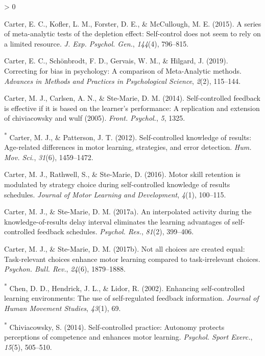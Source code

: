 \documentclass[
  english,
  man,floatsintext]{apa7}
\newlength{\cslhangindent}
\newenvironment{CSLReferences}[2] %
 {%
  \setlength{\parindent}{0pt}
  \ifodd #1 \everypar{\setlength{\hangindent}{\cslhangindent}}\ignorespaces\fi
  \ifnum #2 > 0
  \setlength{\parskip}{#2\baselineskip}
  \fi
 }%
 {}
\begin{document}
\begin{CSLReferences}{1}{0}
\leavevmode\hypertarget{ref-Carter2015-zk}{}%
Carter, E. C., Kofler, L. M., Forster, D. E., \& McCullough, M. E. (2015). A series of meta-analytic tests of the depletion effect: Self-control does not seem to rely on a limited resource. \emph{J. Exp. Psychol. Gen.}, \emph{144}(4), 796--815.

\leavevmode\hypertarget{ref-Carter2019-vv}{}%
Carter, E. C., Schönbrodt, F. D., Gervais, W. M., \& Hilgard, J. (2019). Correcting for bias in psychology: A comparison of {Meta-Analytic} methods. \emph{Advances in Methods and Practices in Psychological Science}, \emph{2}(2), 115--144.

\leavevmode\hypertarget{ref-Carter2014-up}{}%
Carter, M. J., Carlsen, A. N., \& Ste-Marie, D. M. (2014). Self-controlled feedback is effective if it is based on the learner's performance: A replication and extension of chiviacowsky and wulf (2005). \emph{Front. Psychol.}, \emph{5}, 1325.

\leavevmode\hypertarget{ref-Carter2012-sj}{}%
\textsuperscript{*} Carter, M. J., \& Patterson, J. T. (2012). Self-controlled knowledge of results: Age-related differences in motor learning, strategies, and error detection. \emph{Hum. Mov. Sci.}, \emph{31}(6), 1459--1472.

\leavevmode\hypertarget{ref-Carter2016-fq}{}%
Carter, M. J., Rathwell, S., \& Ste-Marie, D. (2016). Motor skill retention is modulated by strategy choice during self-controlled knowledge of results schedules. \emph{Journal of Motor Learning and Development}, \emph{4}(1), 100--115.

\leavevmode\hypertarget{ref-Carter2017-ix}{}%
Carter, M. J., \& Ste-Marie, D. M. (2017a). An interpolated activity during the knowledge-of-results delay interval eliminates the learning advantages of self-controlled feedback schedules. \emph{Psychol. Res.}, \emph{81}(2), 399--406.

\leavevmode\hypertarget{ref-Carter2017-mk}{}%
Carter, M. J., \& Ste-Marie, D. M. (2017b). Not all choices are created equal: Task-relevant choices enhance motor learning compared to task-irrelevant choices. \emph{Psychon. Bull. Rev.}, \emph{24}(6), 1879--1888.

\leavevmode\hypertarget{ref-Chen2002-vg}{}%
\textsuperscript{*} Chen, D. D., Hendrick, J. L., \& Lidor, R. (2002). Enhancing self-controlled learning environments: The use of self-regulated feedback information. \emph{Journal of Human Movement Studies}, \emph{43}(1), 69.

\leavevmode\hypertarget{ref-Chiviacowsky2014-ob}{}%
\textsuperscript{*} Chiviacowsky, S. (2014). Self-controlled practice: Autonomy protects perceptions of competence and enhances motor learning. \emph{Psychol. Sport Exerc.}, \emph{15}(5), 505--510.


\end{CSLReferences}
\end{document}
